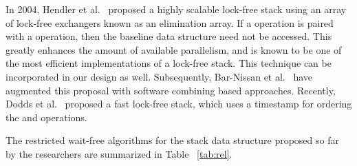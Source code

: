 \documentclass{llncs}
\begin{document}
In 2004, Hendler et al.~\cite{LockFree} proposed a highly scalable lock-free
stack using  an array of lock-free exchangers known as an elimination array.
If a  operation is paired with a  operation, then the baseline data structure need
not be accessed. This greatly enhances the amount of available parallelism, and
is known to be one of the most efficient implementations of a lock-free stack. 
This technique can be incorporated in our design as well.
Subsequently, Bar-Nissan et al.~\cite{DECS} have augmented this proposal with
software combining based approaches. 
Recently, Dodds et al.~\cite{timestamp} proposed a fast lock-free stack, which uses a
timestamp for ordering the  and  operations.

The restricted wait-free algorithms for the stack data structure proposed so far by the researchers are summarized
in Table ~\ref{tab:rel}.
\end{document}
